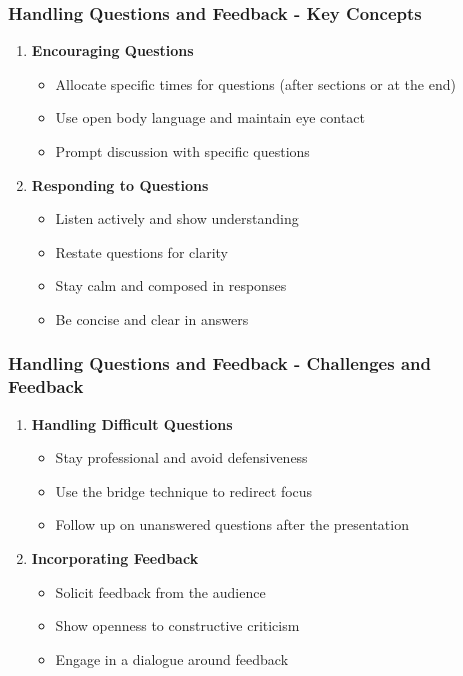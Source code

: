 \documentclass[aspectratio=169]{beamer}
\begin{document}
\begin{frame}[fragile]
  \frametitle{Handling Questions and Feedback - Key Concepts}
  \begin{enumerate}
    \item \textbf{Encouraging Questions}
      \begin{itemize}
        \item Allocate specific times for questions (after sections or at the end)
        \item Use open body language and maintain eye contact
        \item Prompt discussion with specific questions
      \end{itemize}
      
    \item \textbf{Responding to Questions}
      \begin{itemize}
        \item Listen actively and show understanding
        \item Restate questions for clarity
        \item Stay calm and composed in responses
        \item Be concise and clear in answers
      \end{itemize}
  \end{enumerate}
\end{frame}

\begin{frame}[fragile]
  \frametitle{Handling Questions and Feedback - Challenges and Feedback}
  \begin{enumerate}[resume]
    \item \textbf{Handling Difficult Questions}
      \begin{itemize}
        \item Stay professional and avoid defensiveness
        \item Use the bridge technique to redirect focus
        \item Follow up on unanswered questions after the presentation
      \end{itemize}
    
    \item \textbf{Incorporating Feedback}
      \begin{itemize}
        \item Solicit feedback from the audience
        \item Show openness to constructive criticism
        \item Engage in a dialogue around feedback
      \end{itemize}
  \end{enumerate}
\end{frame}
\end{document}
